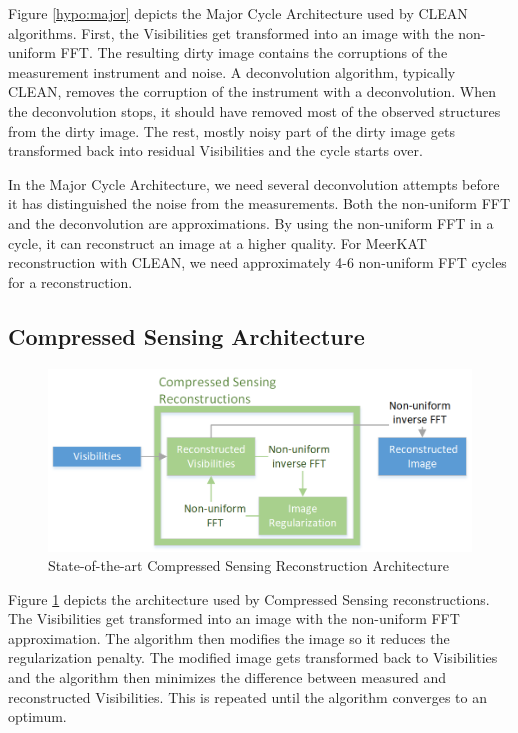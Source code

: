 Figure \ref{hypo:major} depicts the Major Cycle Architecture used by CLEAN algorithms. First, the Visibilities get transformed into an image with the non-uniform FFT. The resulting dirty image contains the corruptions of the measurement instrument and noise. A deconvolution algorithm, typically CLEAN, removes the corruption of the instrument with a deconvolution. When the deconvolution stops, it should have removed most of the observed structures from the dirty image. The rest, mostly noisy part of the dirty image gets transformed back into residual Visibilities and the cycle starts over.

In the Major Cycle Architecture, we need several deconvolution attempts before it has distinguished the noise from the measurements. Both the non-uniform FFT and the deconvolution are approximations. By using the non-uniform FFT in a cycle, it can reconstruct an image at a higher quality. For MeerKAT reconstruction with CLEAN, we need approximately 4-6 non-uniform FFT cycles for a reconstruction.


\subsection{Compressed Sensing Architecture}\label{hypo:CSArch}

\begin{figure}[h]
	\centering
	\includegraphics[width=0.80\linewidth]{./chapters/02.hypo/CS.png}
	\caption{State-of-the-art Compressed Sensing Reconstruction Architecture}
	\label{hypo:cs}
\end{figure}

Figure \ref{hypo:cs} depicts the architecture used by Compressed Sensing reconstructions. The Visibilities get transformed into an image with the non-uniform FFT approximation. The algorithm then modifies the image so it reduces the regularization penalty. The modified image gets transformed back to Visibilities and the algorithm then minimizes the difference between measured and reconstructed Visibilities. This is repeated until the algorithm converges to an optimum.

